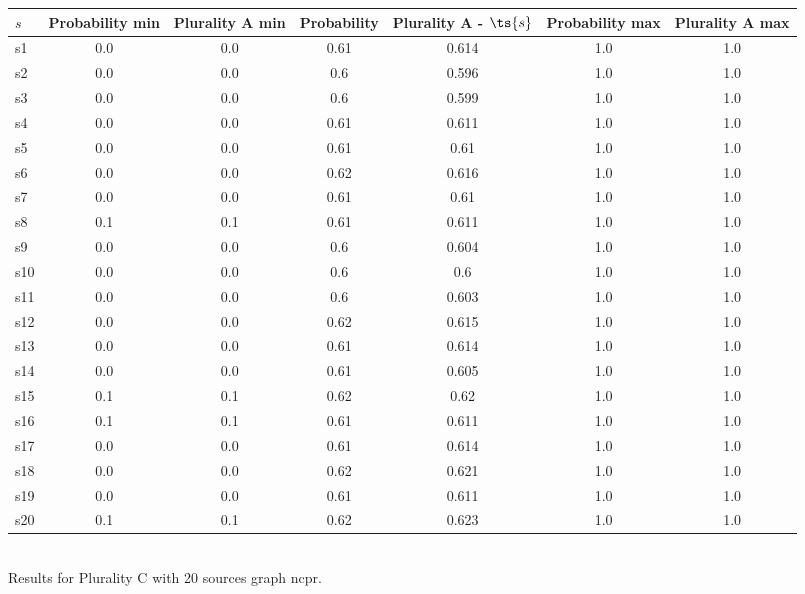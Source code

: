 \documentclass{article}
\begin{document}
\noindent\begin{tabular}{|l|c|c|c|c|c|c|}
\hline
$s$& Probability min & Plurality A min & Probability & Plurality A - $\ts{s}$ & Probability max & Plurality A max\\
\hline
s1 &0.0 & 0.0 & 0.61 & 0.614 & 1.0 & 1.0\\
\hline
s2 &0.0 & 0.0 & 0.6 & 0.596 & 1.0 & 1.0\\
\hline
s3 &0.0 & 0.0 & 0.6 & 0.599 & 1.0 & 1.0\\
\hline
s4 &0.0 & 0.0 & 0.61 & 0.611 & 1.0 & 1.0\\
\hline
s5 &0.0 & 0.0 & 0.61 & 0.61 & 1.0 & 1.0\\
\hline
s6 &0.0 & 0.0 & 0.62 & 0.616 & 1.0 & 1.0\\
\hline
s7 &0.0 & 0.0 & 0.61 & 0.61 & 1.0 & 1.0\\
\hline
s8 &0.1 & 0.1 & 0.61 & 0.611 & 1.0 & 1.0\\
\hline
s9 &0.0 & 0.0 & 0.6 & 0.604 & 1.0 & 1.0\\
\hline
s10 &0.0 & 0.0 & 0.6 & 0.6 & 1.0 & 1.0\\
\hline
s11 &0.0 & 0.0 & 0.6 & 0.603 & 1.0 & 1.0\\
\hline
s12 &0.0 & 0.0 & 0.62 & 0.615 & 1.0 & 1.0\\
\hline
s13 &0.0 & 0.0 & 0.61 & 0.614 & 1.0 & 1.0\\
\hline
s14 &0.0 & 0.0 & 0.61 & 0.605 & 1.0 & 1.0\\
\hline
s15 &0.1 & 0.1 & 0.62 & 0.62 & 1.0 & 1.0\\
\hline
s16 &0.1 & 0.1 & 0.61 & 0.611 & 1.0 & 1.0\\
\hline
s17 &0.0 & 0.0 & 0.61 & 0.614 & 1.0 & 1.0\\
\hline
s18 &0.0 & 0.0 & 0.62 & 0.621 & 1.0 & 1.0\\
\hline
s19 &0.0 & 0.0 & 0.61 & 0.611 & 1.0 & 1.0\\
\hline
s20 &0.1 & 0.1 & 0.62 & 0.623 & 1.0 & 1.0\\
\hline
\end{tabular}\\

\noindent Results for Plurality C with 20 sources graph ncpr.
\end{document}
